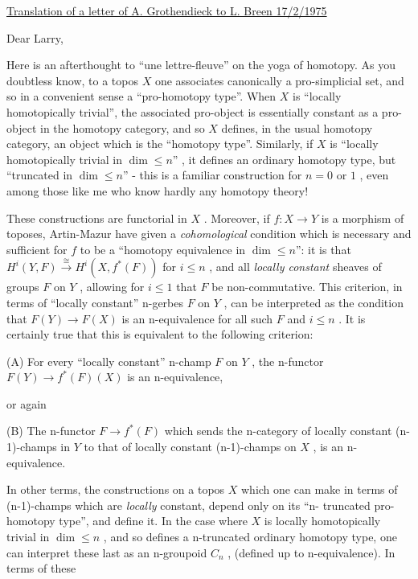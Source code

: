 \uline{Translation of a letter of A. Grothendieck to L. Breen 17/2/1975}

Dear Larry,

Here is an afterthought to ``une lettre-fleuve'' on the yoga of homotopy.
As you doubtless know, to a topos $X$ one associates canonically a pro-simplicial
set, and so in a convenient sense a ``pro-homotopy type''. When $X$ is ``locally
homotopically trivial'', the associated pro-object is essentially constant as
a pro-object in the homotopy category, and so $X$ defines, in the usual homotopy
category, an object which is the ``homotopy type''. Similarly, if $X$ is
``locally homotopically trivial in $\dim \leq n$'' , it defines an ordinary homotopy
type, but ``truncated in $\dim \leq n$'' - this is a familiar construction for $n = 0$
or $1$ , even among those like me who know hardly any homotopy theory!

These constructions are functorial in $X$ . Moreover, if $f : X \to Y$ is
a morphism of toposes, Artin-Mazur have given a \textit{cohomological} condition which 
is necessary and sufficient for $f$ to be a ``homotopy equivalence in $\dim \leq n$'':
it is that $H^{i}(Y, F) \xrightarrow{\cong} H^{i}(X, f^{*}(F))$ for $i \leq n$ , and all \textit{locally constant}
sheaves of groups $F$ on $Y$ , allowing for $i \leq 1$ that $F$ be non-commutative.
This criterion, in terms of ``locally constant'' n-gerbes $F$ on $Y$ , can be
interpreted as the condition that $F(Y) \to F(X)$ is an n-equivalence for all
such $F$ and $i \leq n$ . It is certainly true that this is equivalent to the
following criterion:

(A) For every ``locally constant'' n-champ $F$ on $Y$ , the n-functor 
$F(Y) \to f^{*}(F)(X)$ is an n-equivalence,

or again

(B) The n-functor $F \to f^{*}(F)$ which sends the n-category of locally
constant (n-1)-champs in $Y$ to that of locally constant (n-1)-champs on
$X$ , is an n-equivalence.

In other terms, the constructions on a topos $X$ which one can make in
terms of (n-1)-champs which are \textit{locally} constant, depend only on its ``n-%
truncated pro-homotopy type'', and define it. In the case where $X$ is locally
homotopically trivial in $\dim \leq n$ , and so defines a n-truncated ordinary
homotopy type, one can interpret these last as an n-groupoid $C_{n}$ , (defined
up to n-equivalence). In terms of these


